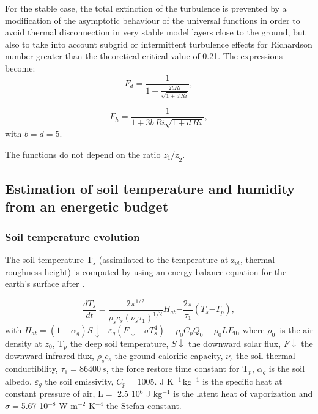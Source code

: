 For the stable case, the total extinction of the turbulence is prevented by
a modification of the asymptotic behaviour of the universal functions in
order to avoid thermal disconnection in very stable model layers close to
the ground, but also to take into account subgrid or intermittent turbulence
effects for Richardson number greater than the theoretical critical value of
0.21. The expressions become:
\begin{equation}
\label{eq20}
F_{d} =\frac{1}{1+\frac{2bRi}{\sqrt
{1+d\, Ri} }},
\end{equation}

\begin{equation}
\label{eq21}
F_{h} =\frac{1}{1+ 3 b \, Ri\sqrt
{1+ d \, Ri} },
\end{equation}
with $b = d = 5$.

The functions do not depend on the ratio $z_{1}
\mbox{/z}_{2} $.

\subsection{Estimation of soil temperature and humidity from an energetic budget}

\subsubsection{Soil temperature evolution}
The soil temperature T$_{s}$ (assimilated to the temperature at z$_{ot}$,
thermal roughness height) is computed by using an energy balance equation
for the earth's surface after \cite{Deardorff:1978}.

\begin{equation}
\label{eq22}
\frac{dT_{s}}{dt}\mathrm{=}\frac{\mathrm{2}\pi^{\mathrm{1/2}}}{\rho
_{s}c_{s}\left( \nu_{s}\tau_{\mathrm{1}}
\right)^{\mathrm{1/2}}}H_{at}\mathrm{-}\frac{\mathrm{2}\pi }{\tau
_{\mathrm{1}}}\left( T_{s}\mathrm{-}T_{p} \right),
\end{equation}
\newline
with $H_{at}=\left( 1-\alpha_{g} \right)S\downarrow +\varepsilon
_{g}(F\downarrow -\sigma T_{s}^{4})-\rho_{0}C_{p}Q_{0}-\rho_{0}LE_{0}$,
\newline
where $\rho_{0}\, $ is the air density at $z_{0}$, T$_{p}$ the deep soil temperature,
\newline
$S\downarrow $ the downward solar flux, $F\downarrow $ the downward infrared flux,
\newline
$\rho_{s}c_{s}$ the ground calorific capacity, $\nu_{s}$ the soil thermal conductibility,
\newline
$\tau_{\mathrm{1}}=86400\, s$, the force restore time constant for T$_{p}$,
\newline
$\alpha_{g}$ is the soil albedo, $\varepsilon_{g}$ the soil emissivity,
\newline
$C_{p}=$1005. J K$^{-1\, }$kg$^{-1}$ is the specific heat at constant pressure of air,
\newline
L$=$ 2.5 10$^{6}$ J kg$^{-1}$ is the latent heat of vaporization and
\newline
$\sigma =$5.67 10$^{-8}$ W m$^{-2}$ K$^{-4}$ the Stefan constant.

